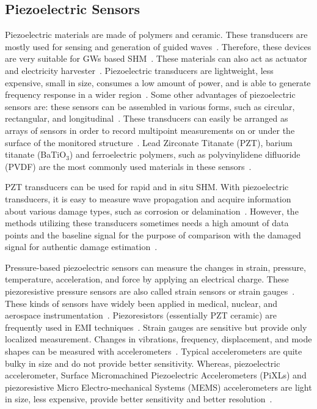 \documentclass[b5paper, 11pt, titlepage]{book}
\begin{document}
\subsection{Piezoelectric Sensors}
Piezoelectric materials are made of polymers and ceramic. These transducers are mostly used for sensing and generation of guided waves~\cite{dimitriadis1991piezoelectric, Schulz1999, Badcock2000, thomas2017structural}. Therefore, these devices are very suitable for GWs based SHM~\cite{stepinski2013advanced}. These materials can also act as actuator and electricity harvester~\cite{Anton2007}. Piezoelectric transducers are lightweight, less expensive, small in size, consumes a low amount of power, and is able to generate frequency response in a wider region~\cite{stepinski2013advanced, su2009identification}. Some other advantages of piezoelectric sensors are: these sensors can be assembled in various forms, such as circular, rectangular, and longitudinal~\cite{stepinski2013advanced}. These transducers can easily be arranged as arrays of sensors in order to record multipoint measurements on or under the surface of the monitored structure~\cite{Stavroulakis2013}. 
Lead Zirconate Titanate (PZT), barium titanate (BaTiO$_3$) and ferroelectric polymers, such as polyvinylidene difluoride (PVDF) are the most commonly used materials in these sensors~\cite{kkedziora2013piezoelectric}.

PZT transducers can be used for rapid and in situ SHM. With piezoelectric transducers, it is easy to measure wave propagation and acquire information about various damage types, such as corrosion or delamination~\cite{TibaduizaBurgos2020,Mitra2016}. However, the methods utilizing these transducers sometimes needs a high amount of data points and the baseline signal for the purpose of comparison with the damaged signal for authentic damage estimation~\cite{Farrar2012,Hameed2019}.

Pressure-based piezoelectric sensors can measure the changes in strain, pressure, temperature, acceleration, and force by applying an electrical charge. These piezoresistive pressure sensors are also called strain sensors or strain gauges~\cite{Das2018, Sikarwar2017}. These kinds of sensors have widely  been applied in medical, nuclear, and aerospace instrumentation~\cite{Sikarwar2017}. Piezoresistors (essentially PZT ceramic) are frequently used in EMI techniques~\cite{TibaduizaBurgos2020, jawaid2018structural}. Strain gauges are sensitive but provide only localized measurement. Changes in vibrations, frequency, displacement, and mode shapes can be measured with accelerometers~\cite{Salawu1997}. Typical accelerometers are quite bulky in size and do not provide better sensitivity. Whereas, piezoelectric accelerometer,  Surface Micromachined Piezoelectric Accelerometers (PiXLs) and piezoresistive Micro Electro-mechanical Systems (MEMS) accelerometers are light in size, less expensive, provide  better sensitivity and better resolution~\cite{Das2018, Nemirovsky1996, DeVoe2001, Sabato2017}.    
\end{document}
